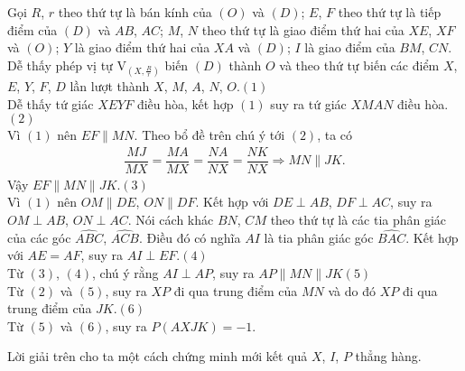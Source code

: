 \begin{bt}
{\begin{center}
		\end{center}
		Gọi $R$, $r$ theo thứ tự là bán kính của $(O)$ và $(D)$; $E$, $F$ theo thứ tự là tiếp điểm của $(D)$ và $AB$, $AC$; $M$, $N$ theo thứ tự là giao điểm thứ hai của $XE$, $XF$ và $(O)$; $Y$ là giao điểm thứ hai của $XA$ và $(D)$; $I$ là giao điểm của $BM$, $CN$.\\
		Dễ thấy phép vị tự $\mathrm{V}_{\left( X,\tfrac{R}{r} \right)}$ biến $(D)$ thành $O$ và theo thứ tự biến các điểm $X$, $E$, $Y$, $F$, $D$ lần lượt thành $X$, $M$, $A$, $N$, $O$.\hfill$(1)$\\
		Dễ thấy tứ giác $XEYF$ điều hòa, kết hợp $(1)$ suy ra tứ giác $XMAN$ điều hòa.\hfill $(2)$\\
		Vì $(1)$ nên $EF\parallel MN$. Theo bổ đề  trên chú ý tới $(2)$, ta có
		\begin{align*}
		\dfrac{MJ}{MX}=\dfrac{MA}{MX}=\dfrac{NA}{NX}=\dfrac{NK}{NX}\Rightarrow MN\parallel JK.
		\end{align*}
		Vậy $EF \parallel MN \parallel JK$.\hfill $(3)$\\
		Vì $(1)$ nên $OM\parallel DE$, $ON\parallel DF$. Kết hợp với $DE\perp AB$, $DF\perp AC$, suy ra $OM\perp AB$, $ON\perp AC$. Nói cách khác $BN$, $CM$ theo thứ tự là các tia phân giác của các góc $\widehat{ABC}$, $\widehat{ACB}$. Điều đó có nghĩa $AI$ là tia phân giác góc $\widehat{BAC}$. Kết hợp với $AE=AF$, suy ra $AI\perp EF$.\hfill $(4)$\\
		Từ $(3)$, $(4)$, chú ý rằng $AI\perp AP$, suy ra $AP\parallel MN\parallel JK$\hfill $(5)$\\
		Từ $(2)$ và $(5)$, suy ra $XP$ đi qua trung điểm của $MN$ và do đó $XP$ đi qua trung điểm của $JK$.\hfill$(6)$\\
		Từ $(5)$ và $(6)$, suy ra $P(AXJK)=-1$.
		\begin{nx}
			Lời giải trên cho ta một cách chứng minh mới kết quả $X$, $I$, $P$ thẳng hàng.
			
		\end{nx}
	}
\end{bt}
